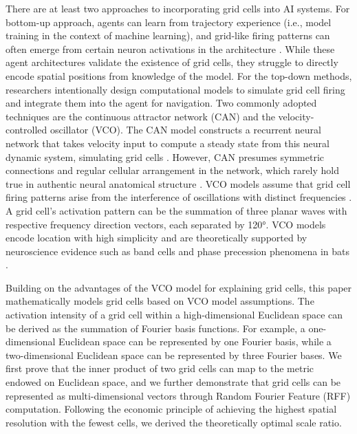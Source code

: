 \documentclass[letterpaper]{article} %
\begin{document}
There are at least two approaches to incorporating grid cells into AI systems. For bottom-up approach, agents can learn from trajectory experience (i.e., model training in the context of machine learning), and grid-like firing patterns can often emerge from certain neuron activations in the architecture \cite{banino2018vector,whittington2022build}. While these agent architectures validate the existence of grid cells, they struggle to directly encode spatial positions from knowledge of the model. For the top-down methods, researchers intentionally design computational models to simulate grid cell firing and integrate them into the agent for navigation. Two commonly adopted techniques are the continuous attractor network (CAN) and the velocity-controlled oscillator (VCO). The CAN model constructs a recurrent neural network that takes velocity input to compute a steady state from this neural dynamic system, simulating grid cells \cite{burak2009accurate}. However, CAN presumes symmetric connections and regular cellular arrangement in the network, which rarely hold true in authentic neural anatomical structure \cite{anselmi2020computational}. VCO models assume that grid cell firing patterns arise from the interference of oscillations with distinct frequencies \cite{burgess2007oscillatory}. A grid cell's activation pattern can be the summation of three planar waves with respective frequency direction vectors, each separated by 120°\cite{blair2007scale}. VCO models encode location with high simplicity and are theoretically supported by neuroscience evidence such as band cells \cite{krupic2012neural} and phase precession phenomena in bats \cite{eliav2018nonoscillatory,yartsev2011grid}.

Building on the advantages of the VCO model for explaining grid cells, this paper mathematically models grid cells based on VCO model assumptions. The activation intensity of a grid cell within a high-dimensional Euclidean space can be derived as the summation of Fourier basis functions. For example, a one-dimensional Euclidean space can be represented by one Fourier basis, while a two-dimensional Euclidean space can be represented by three Fourier bases. We first prove that the inner product of two grid cells can map to the metric endowed on Euclidean space, and we further demonstrate that grid cells can be represented as multi-dimensional vectors through Random Fourier Feature (RFF) computation. Following the economic principle of achieving the highest spatial resolution with the fewest cells, we derived the theoretically optimal scale ratio. 
\end{document}
